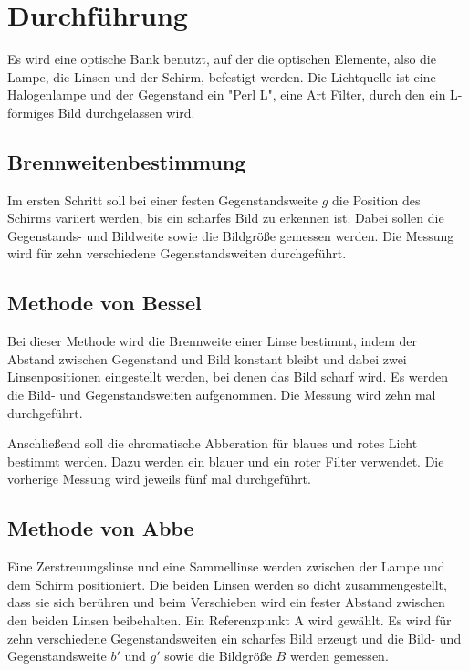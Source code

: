 \section{Durchführung}
\label{sec:Durchführung}

Es wird eine optische Bank benutzt, auf der die optischen Elemente, also die Lampe, die Linsen und der Schirm, befestigt werden.
Die Lichtquelle ist eine Halogenlampe und der Gegenstand ein "Perl L", eine Art Filter, durch den ein L-förmiges Bild durchgelassen wird. 

\subsection{Brennweitenbestimmung}
Im ersten Schritt soll bei einer festen Gegenstandsweite $g$ die Position des Schirms variiert werden, bis ein scharfes Bild zu erkennen ist. Dabei sollen die Gegenstands- und Bildweite sowie die Bildgröße gemessen werden. 
Die Messung wird für zehn verschiedene Gegenstandsweiten durchgeführt.

\subsection{Methode von Bessel}
Bei dieser Methode wird die Brennweite einer Linse bestimmt, indem der Abstand zwischen Gegenstand und Bild konstant bleibt und dabei zwei Linsenpositionen eingestellt werden, bei denen das Bild scharf wird.
Es werden die Bild- und Gegenstandsweiten aufgenommen.
Die Messung wird zehn mal durchgeführt.

\noindent Anschließend soll die chromatische Abberation für blaues und rotes Licht bestimmt werden. Dazu werden ein blauer und ein roter Filter verwendet. Die vorherige Messung wird jeweils fünf mal durchgeführt. 

\subsection{Methode von Abbe}
Eine Zerstreuungslinse und eine Sammellinse werden zwischen der Lampe und dem Schirm positioniert. Die beiden Linsen werden so dicht zusammengestellt, dass sie sich berühren und beim Verschieben wird ein fester Abstand zwischen den beiden Linsen beibehalten. Ein Referenzpunkt A wird gewählt. Es wird für zehn verschiedene Gegenstandsweiten ein scharfes Bild erzeugt und die Bild- und Gegenstandsweite $b'$ und $g'$ sowie die Bildgröße $B$ werden gemessen.